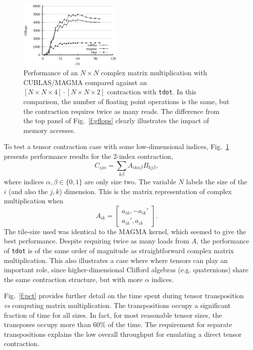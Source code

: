 \documentclass{sigplanconf}
\begin{document}
\begin{figure}
{ \centering
\includegraphics[width=0.45\textwidth]{cgemm.eps}
\caption{Performance of an $N\times N$ complex matrix multiplication
with CUBLAS/MAGMA
compared against an $[N\times N\times 4] \cdot [N\times N\times 2]$
contraction with {\tt tdot}.  In this comparison, the number of floating point operations
is the same, but the contraction requires twice as many reads.
The difference from the top panel of Fig.~\ref{f:gflops} clearly illustrates
the impact of memory accesses.}\label{f:cplx}}
\end{figure}

  To test a tensor contraction case with some low-dimensional indices,
Fig.~\ref{f:cplx} presents performance results for the 2-index
contraction,
\begin{equation}
C_{ij\alpha} = \sum_{k\beta} A_{ik\alpha\beta} B_{kj\beta}
,
\end{equation}
where indices $\alpha,\beta \in \{0,1\}$ are only size two.
The variable $N$ labels the size of the $i$ (and also the $j, k$)
dimension.
This is the matrix representation of complex multiplication
when
\begin{equation}
A_{ik} = \begin{bmatrix}a_{ik}, -a_{ik}'\\
a_{ik}', a_{ik}\end{bmatrix} .
\end{equation}
The tile-size used was identical to the MAGMA kernel,
which seemed to give the best performance.
Despite requiring twice as many loads from $A$,
the performance of {\tt tdot} is of the same
order of magnitude as 
straightforward complex matrix multiplication.
This also illustrates a case where where
tensors can play an important role, since
higher-dimensional Clifford algebras (e.g. quaternions) share the same
contraction structure, but with more $\alpha$ indices.

  Fig.~\ref{f:pct} provides further detail on the time spent during tensor transposition
{\em vs} computing matrix multiplication.  The transpositions occupy a significant
fraction of time for all sizes.  In fact, for most reasonable tensor sizes, the transposes
occupy more than 60\% of the time.  The requirement for separate transpositions
explains the low overall throughput for emulating a direct tensor contraction.
\end{document}
